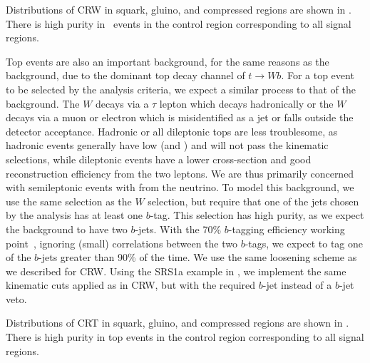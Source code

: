 Distributions of CRW in squark, gluino, and compressed regions are shown in .
There is high purity in \wjets~events in the control region corresponding to all signal regions.

Top events are also an important background, for the same reasons as the \wjets~ background, due to the dominant top decay channel of $t \rightarrow Wb$.
For a top event to be selected by the analysis criteria, we expect a similar process to that of the \wjets background.
The $W$ decays via a $\tau$ lepton which decays hadronically or the $W$ decays via a muon or electron which is misidentified as a jet or falls outside the detector acceptance.
Hadronic or all dileptonic tops are less troublesome, as hadronic \ttbar events generally have low \met (and ) and will not pass the kinematic selections, while dileptonic \ttbar events have a lower cross-section and good reconstruction efficiency from the two leptons.
We are thus primarily concerned with semileptonic \ttbar events with \met from the neutrino.
To model this background, we use the same selection as the $W$ selection, but require that one of the jets chosen by the analysis has at least one $b$-tag.
This selection has high purity, as we expect the \ttbar background to have two $b$-jets.
With the 70\% $b$-tagging efficiency working point~\cite{Aad:2015ydr,ATL-PHYS-PUB-2016-012}, ignoring (small) correlations between the two $b$-tags, we expect to tag one of the $b$-jets greater than 90\% of the time.
We use the same loosening scheme as we described for CRW.
Using the SRS1a example in , we implement the same kinematic cuts applied as in CRW, but with the required $b$-jet instead of a $b$-jet veto.

Distributions of CRT in squark, gluino, and compressed regions are shown in .
There is high purity in top events in the control region corresponding to all signal regions.

